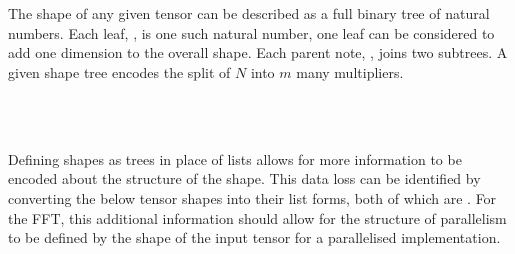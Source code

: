 \begin{AgdaAlign}
\begin{code}[hide]
\\
\>[4][@{}l@{\AgdaIndent{0}}]%
\>[6]\AgdaSpace{}%
\AgdaSpace{}%
\AgdaSymbol{:}\AgdaSpace{}%
\<%
\\
%
\>[6]\AgdaSpace{}%
\AgdaSpace{}%
\AgdaSpace{}%
\AgdaSymbol{:}\AgdaSpace{}%
\<%
\end{code}
The shape of any given tensor can be described as a full binary tree of natural 
numbers.
Each leaf, , is one such natural number, one leaf 
can be considered to add one dimension to the overall shape. 
Each parent note, , joins two subtrees.
A given shape tree encodes the split of $N$ into $m$ many multipliers.

\begin{code}%
%
\>[2]\AgdaSpace{}%
\AgdaSpace{}%
\AgdaSymbol{:}\AgdaSpace{}%
\AgdaSpace{}%
\<%
\\
\>[2][@{}l@{\AgdaIndent{0}}]%
\>[4]%
\>[8]\AgdaSymbol{:}\AgdaSpace{}%
\AgdaSpace{}%
\AgdaSpace{}%
\<%
\\
%
\>[4]\AgdaSpace{}%
\AgdaSymbol{:}\AgdaSpace{}%
\AgdaSpace{}%
\AgdaSpace{}%
\AgdaSpace{}%
\AgdaSpace{}%
\<%
\end{code}

Defining shapes as trees in place of lists allows for more information to be 
encoded about the structure of the shape. 
This data loss can be identified by converting the below tensor shapes into their
list forms, both of which are .
For the FFT, this additional information should allow for the structure of parallelism 
to be defined by the shape of the input tensor for a parallelised implementation.


\end{AgdaAlign}
